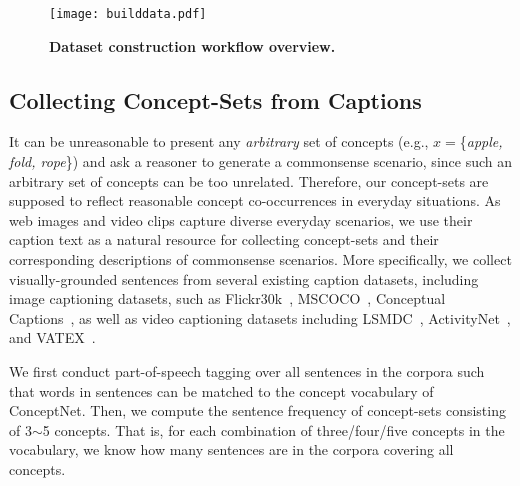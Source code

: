 \documentclass[11pt,a4paper]{article}
\begin{document}
	
\begin{figure}[t!]
		\centering
		\texttt{[image: builddata.pdf]}
		\caption{ \textbf{Dataset construction workflow overview.} 
		\vspace{-1em}
		}
		\label{fig:builddata}
	\end{figure}

	\subsection{Collecting Concept-Sets from Captions}
	\label{ssec:conceptset}
It can be unreasonable to present any \emph{arbitrary} set of concepts (e.g., $x=$\{\textit{apple, fold, rope}\}) and ask a reasoner to generate a commonsense scenario, since such an arbitrary set of concepts can be too unrelated. Therefore, our concept-sets are supposed to reflect reasonable concept co-occurrences in everyday situations.
As web images and video clips capture diverse everyday scenarios, 
    we use their caption text as a natural resource for collecting concept-sets and their corresponding descriptions of commonsense scenarios.
More specifically, we collect visually-grounded sentences from several existing caption datasets, including {image captioning} datasets, such as  {Flickr30k}~\cite{young-etal-2014-image}, {MSCOCO}~\cite{Lin2014MicrosoftCC}, {Conceptual Captions}~\cite{Sharma2018ConceptualCA}, as well as {video captioning} datasets including {LSMDC}~\cite{lsmdc}, {ActivityNet}~\cite{krishna2017dense}, and {VATEX}~\cite{Wang_2019_ICCV}.
	
We first conduct part-of-speech tagging over all sentences in the corpora such that words in sentences can be matched to the concept vocabulary of ConceptNet.
	Then, we compute the sentence frequency of 
	concept-sets consisting of  3$\sim$5 concepts.
	That is, for each combination of three/four/five concepts in the vocabulary, we know how many sentences are in the corpora covering all concepts.
	
\end{document}
